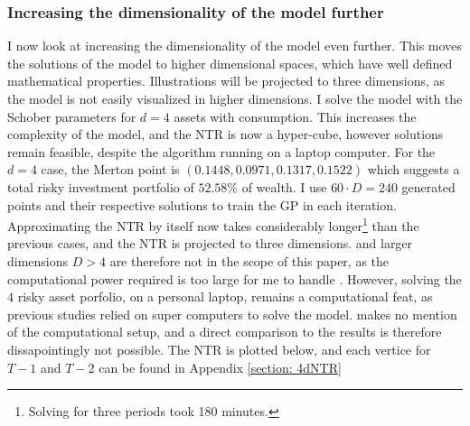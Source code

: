 \documentclass[11pt]{article}
\begin{document}
\subsubsection{Increasing the dimensionality of the model further} \label{Subsubsection: IncreasingDimensionalityFurther}
I now look at increasing the dimensionality of the model even further.
This moves the solutions of the model to higher dimensional spaces, which have well defined mathematical properties.
Illustrations will be projected to three dimensions, as the model is not easily visualized in higher dimensions.
I solve the model with the Schober parameters for $d = 4$ assets with consumption. This increases the complexity of the model, and the \ac{NTR} is now a hyper-cube,
however solutions remain feasible, despite the algorithm running on a laptop computer.
For the $d = 4$ case, the Merton point is $(0.1448, 0.0971, 0.1317, 0.1522)$ which suggests a total risky investment portfolio of $52.58\%$ of wealth.
I use $60\cdot D = 240$ generated points and their respective solutions to train the \ac{GP} in each iteration.
Approximating the \ac{NTR} by itself now takes considerably longer\footnote{Solving for three periods took 180 minutes.} than the previous cases, and the \ac{NTR} is projected to three dimensions.
and larger dimensions $D>4$ are therefore not in the scope of this paper, as the computational power required
is too large for me to handle .
However, solving the $4$ risky asset porfolio, on a personal laptop, remains a computational feat, as previous studies \autocites{CaiJuddXu2013}{Schober2022} relied on super computers to solve the model.
\autocite{Scheidegger2023} makes no mention of the computational setup, and a direct comparison to the results is therefore dissapointingly not possible.
The NTR is plotted below, and each vertice for $T-1$ and $T-2$ can be found in Appendix \ref{section: 4dNTR}
\end{document}
